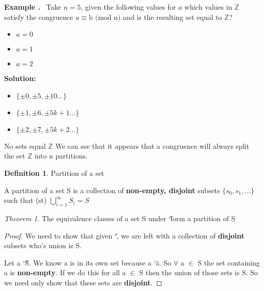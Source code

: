 \documentclass{article}
\newcounter{example}
\newcounter{solution}
\theoremstyle{definition}
\newtheorem{definition}{Definition}[section]
\theoremstyle{claim}
\theoremstyle{remark}
\theoremstyle{theorem}
\newtheorem{theorem}{Theorem}
\newcommand\Example{%
  \stepcounter{example}%
  \textbf{Example \theexample.}~%
  \setcounter{solution}{0}%
}
\newcommand\TheSolution{%
  \textbf{Solution:}\\%
}
\begin{document}
\begin{flushleft}
\newline
\newline
\Example Take $n = 5$, given the following values for $a$ which values in $\mathbb{Z}$ satisfy the congruence $a \equiv \text{b (mod n)}$ and is the resulting set equal to $\mathbb{Z}$?
\begin{itemize}
     \item $a = 0$
     \item $a = 1$
     \item $a = 2$
\end{itemize}
\TheSolution 
\begin{itemize}
     \item $\{\pm{0}, \pm{5}, \pm{10}\dots\}$
     \item $\{\pm{1}, \pm{6}, \pm{5k+1}\dots\}$
     \item $\{\pm{2}, \pm{7}, \pm{5k+2}\dots\}$
\end{itemize}
No sets equal $\mathbb{Z}$
\newline
\newline
We can see that it appears that a congruence will always split the set $\mathbb{Z}$ into n partitions.
\newline
\begin{definition}{Partition of a set}

A partition of a set S is a collection of \textbf{non-empty, disjoint} subsets $\{s_{0}, s_{1}, \dots\}$ such that (st) $\bigcup\limits_{i=1}^{\infty} S_{i} = S$

\end{definition}
\begin{theorem}{The equivalence classes of a set S under \char`\~ form a partition of S}
\begin{proof}{
We need to show that given \char`\~, we are left with a collection of \textbf{disjoint} subsets who's union is S.

Let a \char`\~ S. We know a is in  its own set because a \char`\~ a. So $\forall$ a $\in$ S the set containing a is \textbf{non-empty}. If we do this for all a $\in$ S then the union of those sets is S. So we need only show that these sets are \textbf{disjoint}.
}
\end{proof}
\end{theorem}


\end{flushleft}
\end{document}
